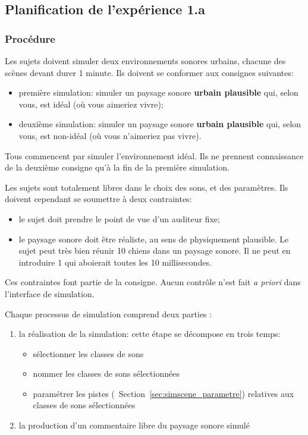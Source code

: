 \documentclass[twoside,twocolumn]{article}
\begin{document}
\subsection{Planification de l'expérience 1.a}
\label{sec:xp1a_plan}

\subsubsection*{Procédure}

Les sujets doivent simuler deux environnements sonores urbains, chacune des scènes devant durer 1 minute. Ils doivent se conformer aux consignes suivantes:

\begin{itemize}
\item première simulation: simuler un paysage sonore \textbf{urbain plausible} qui, selon vous, est idéal (où vous aimeriez vivre);
\item deuxième simulation: simuler un paysage sonore \textbf{urbain plausible} qui, selon vous, est non-idéal (où vous n'aimeriez pas vivre).
\end{itemize}

Tous commencent par simuler l'environnement idéal. Ils ne prennent connaissance de la deuxième consigne qu'à la fin de la première simulation.

Les sujets sont totalement libres dans le choix des sons, et des paramètres. Ils doivent cependant se soumettre à deux contraintes:

\begin{itemize}
\item le sujet doit prendre le point de vue d’un auditeur fixe;
\item le paysage sonore doit être réaliste, au sens de physiquement plausible. Le sujet peut très bien réunir 10 chiens dans un paysage sonore. Il ne peut en introduire 1 qui aboierait toutes les 10 millisecondes.
\end{itemize}

Ces contraintes font partie de la consigne. Aucun contrôle n'est fait \emph{a priori} dans l'interface de simulation.

Chaque processus de simulation comprend deux parties :

\begin{enumerate}
\item la réalisation de la simulation: cette étape se décompose en trois temps:
\begin{itemize}
\item sélectionner les classes de sons
\item nommer les classes de sons sélectionnées
\item paramétrer les pistes (\cf~Section~\ref{sec:simscene_parametre}) relatives aux classes de sons sélectionnées
\end{itemize}
\item la production d'un commentaire libre du paysage sonore simulé
\end{enumerate}
\end{document}
